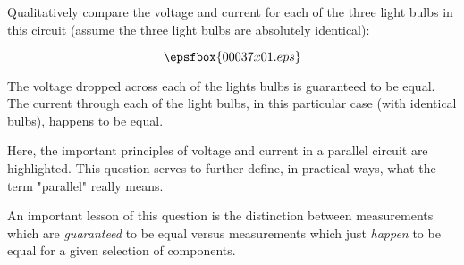 

Qualitatively compare the voltage and current for each of the three light bulbs in this circuit (assume the three light bulbs are absolutely identical):

$$\epsfbox{00037x01.eps}$$







The voltage dropped across each of the lights bulbs is guaranteed to be equal.  The current through each of the light bulbs, in this particular case (with identical bulbs), happens to be equal.







Here, the important principles of voltage and current in a parallel circuit are highlighted.  This question serves to further define, in practical ways, what the term "parallel" really means.

An important lesson of this question is the distinction between measurements which are {\it guaranteed} to be equal versus measurements which just {\it happen} to be equal for a given selection of components.




